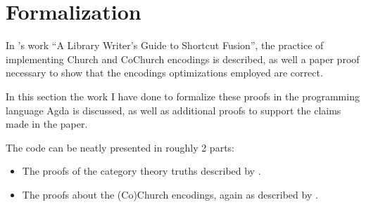 \section{Formalization}\label{sec:formalization}
In \cite{Harper2011}'s work ``A Library Writer's Guide to Shortcut Fusion'', the practice of implementing Church and CoChurch encodings is described, as well a paper proof necessary to show that the encodings optimizations employed are correct.

In this section the work I have done to formalize these proofs in the programming language Agda is discussed, as well as additional proofs to support the claims made in the paper.

The code can be neatly presented in roughly 2 parts:
\begin{itemize}
  \item The proofs of the category theory truths described by \cite{Harper2011}.
  \item The proofs about the (Co)Church encodings, again as described by \cite{Harper2011}.
\end{itemize}




